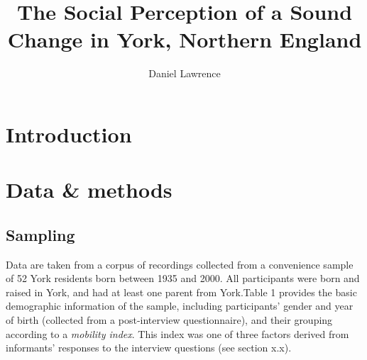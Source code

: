 \documentclass[PWPL]{article}
\title{The Social Perception of a Sound Change in York, Northern England}
\author{Daniel Lawrence}
\begin{document}
\maketitle

\section{Introduction}

\section{Data \& methods}

\subsection{Sampling}

Data are taken from a corpus of recordings collected from a convenience sample of 52 York residents born between 1935 and 2000. All participants were born and raised in York, and had at least one parent from York.Table 1 provides the basic demographic information of the sample, including participants' gender and year of birth (collected from a post-interview questionnaire), and their grouping according to a \textit{mobility index}. This index was one of three factors derived from informants' responses to the interview questions (see section x.x).
\end{document}
